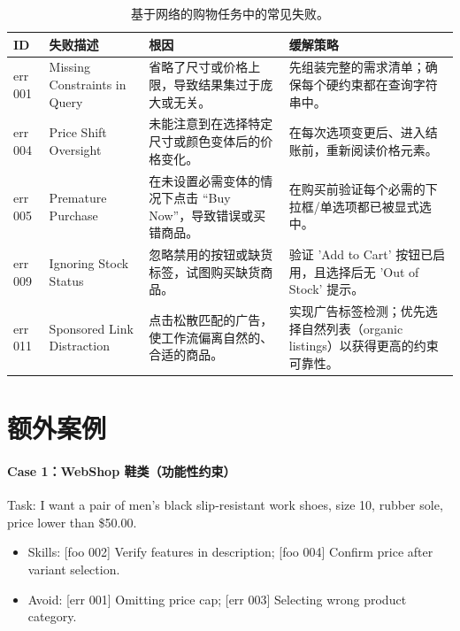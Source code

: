 \documentclass[11pt,UTF8,fontset=fandol]{ctexart}
\begin{document}
\begin{table}[H]\centering
\caption{基于网络的购物任务中的常见失败。}
\label{tab:8}
\small
\renewcommand{\arraystretch}{1.2}
\begin{tabular}{p{1.1cm}p{3.0cm}p{5.0cm}p{4.8cm}}
\toprule
ID & 失败描述 & 根因 & 缓解策略 \\
\midrule
err 001 & Missing Constraints in Query & 省略了尺寸或价格上限，导致结果集过于庞大或无关。 & 先组装完整的需求清单；确保每个硬约束都在查询字符串中。 \\
err 004 & Price Shift Oversight & 未能注意到在选择特定尺寸或颜色变体后的价格变化。 & 在每次选项变更后、进入结账前，重新阅读价格元素。 \\
err 005 & Premature Purchase & 在未设置必需变体的情况下点击 ``Buy Now''，导致错误或买错商品。 & 在购买前验证每个必需的下拉框/单选项都已被显式选中。 \\
err 009 & Ignoring Stock Status & 忽略禁用的按钮或缺货标签，试图购买缺货商品。 & 验证 'Add to Cart' 按钮已启用，且选择后无 'Out of Stock' 提示。 \\
err 011 & Sponsored Link Distraction & 点击松散匹配的广告，使工作流偏离自然的、合适的商品。 & 实现广告标签检测；优先选择自然列表（organic listings）以获得更高的约束可靠性。 \\
\bottomrule
\end{tabular}
\end{table}

\section{额外案例}

\paragraph{Case 1：WebShop 鞋类（功能性约束）}
Task: I want a pair of men's black slip-resistant work shoes, size 10, rubber sole, price lower than \$50.00.
\begin{itemize}[leftmargin=1.5em,itemsep=0.1em]
\item Skills: [foo 002] Verify features in description; [foo 004] Confirm price after variant selection.
\item Avoid: [err 001] Omitting price cap; [err 003] Selecting wrong product category.
\end{itemize}
\end{document}
